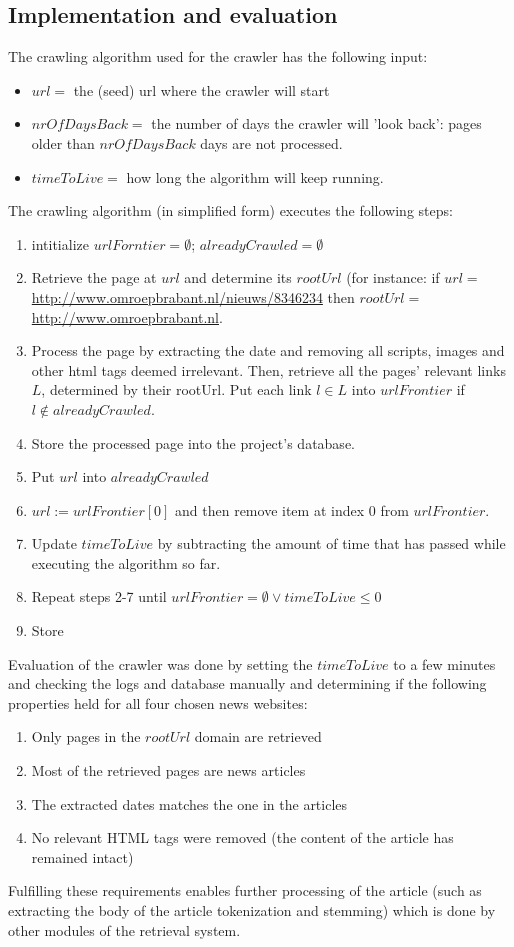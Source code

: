 \subsection*{Implementation and evaluation}
The crawling algorithm used for the crawler has the following input:
\begin{itemize}[noitemsep]
\item $url = $ the (seed) url where the crawler will start
\item $nrOfDaysBack = $ the number of days the crawler will 'look back': pages older than $nrOfDaysBack$ days are not processed.
\item $timeToLive = $ how long the algorithm will keep running.
\end{itemize}
The crawling algorithm (in simplified form) executes the following steps:
\begin{enumerate}
\item intitialize $urlForntier = \emptyset$; $alreadyCrawled = \emptyset$
\item Retrieve the page at $url$ and determine its $rootUrl$ (for instance: if $url = $\url{http://www.omroepbrabant.nl/nieuws/8346234} then $rootUrl = $\url{http://www.omroepbrabant.nl}.
\item Process the page by extracting the date and removing all scripts, images and other html tags deemed irrelevant. Then, retrieve all the pages' relevant links $L$, determined by their rootUrl. Put each link $l \in L$ into $urlFrontier$ if $l \not\in alreadyCrawled$. 
\item Store the processed page into the project's database.
\item Put $url$ into $alreadyCrawled$
\item $url := urlFrontier[0]$ and then remove item at index 0 from $urlFrontier$.
\item Update $timeToLive$ by subtracting the amount of time that has passed while executing the algorithm so far.
\item Repeat steps 2-7 until $urlFrontier = \emptyset \vee timeToLive \le 0$
\item Store 
\end{enumerate}
Evaluation of the crawler was done by setting the $timeToLive$ to a few minutes and checking the logs and database manually and determining if the following properties held for all four chosen news websites:
\begin{enumerate}
\item Only pages in the $rootUrl$ domain are retrieved
\item Most of the retrieved pages are news articles
\item The extracted dates matches the one in the articles
\item No relevant HTML tags were removed (the content of the article has remained intact)
\end{enumerate}
Fulfilling these requirements enables further processing of the article (such as extracting the body of the article tokenization and stemming) which is done by other modules of the retrieval system.\\
